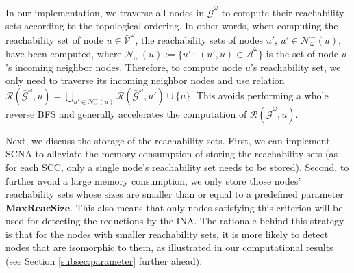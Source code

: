 \documentclass[a4paper,10pt]{article}
\newcommand{\maxlength}{\mathbf{MaxReacSize}}
\newcommand{\V}{\mathcal{V}}
\theoremstyle{plain}
\newcommand{\revv}[1]{{#1}}
\begin{document}
{	%
	In our implementation, we traverse all nodes in $\bar{\mathcal{G}}^{\omega}$ to compute their reachability sets according to the {topological ordering}.
	In other words, when computing the reachability set of node $u\in\bar{\V}^{\omega}$, the reachability sets of nodes $u'$, $u'\in \mathcal{N}_{\omega}^-(u)$, have been computed, where $ \mathcal{N}_{\omega}^-(u):=\{ u' \,:\,(u',u) \in \mathcal{\bar{A}}^\omega \}$ is the set of node $u$'s \revv{incoming} neighbor nodes.
	Therefore, to compute node $u$'s reachability set,  we only need to traverse its
	\revv{incoming} neighbor nodes and use relation $ \mathcal{R}(\mathcal{\bar{G}^\omega}, u) = \bigcup_{u' \in \mathcal{N}_{\omega}^-(u)} \mathcal{R}(\mathcal{\bar{G}^\omega}, u')\cup \{u\}$.
	This avoids performing a whole reverse BFS and generally accelerates the computation of $\mathcal{R}(\mathcal{\bar{G}^\omega}, u)$.
	
	Next, we discuss the storage of the reachability sets.
	First, we can implement SCNA to alleviate the memory consumption of storing the reachability sets (as for each SCC, only a single node's reachability set needs to be stored).
	Second, to further avoid a large memory consumption,  we \revv{only store} those nodes' reachability sets whose sizes are smaller than or equal to a predefined parameter $\maxlength$.
	This also means that only nodes satisfying this criterion will be used for detecting the reductions by the INA.
	The rationale behind this strategy is that for the nodes with smaller reachability sets, it is more likely to detect nodes that are isomorphic to them, as illustrated in our computational results (see \revv{Section} \ref{subsec:parameter} further ahead).
	
}
\end{document}
